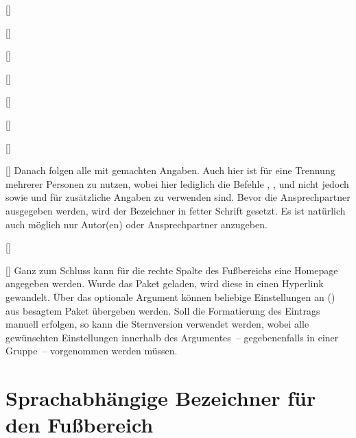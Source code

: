 \begin{Bundle*}[v2.05]{}
\begin{Declaration}{[]}
\begin{Declaration}{[]}
\begin{Declaration}{[]}
\begin{Declaration}{[]}
\begin{Declaration}{[]}
\begin{Declaration}{[]}
\begin{Declaration}{[]}
\begin{Declaration}{[]}
Danach folgen alle mit  gemachten Angaben. Auch hier ist 
 für eine Trennung mehrerer Personen zu nutzen, wobei hier lediglich 
die Befehle , ,  und 
 nicht jedoch  sowie  und 
 für zusätzliche Angaben zu verwenden sind. Bevor die 
Ansprechpartner ausgegeben werden, wird der Bezeichner  
in fetter Schrift gesetzt. Es ist natürlich auch möglich nur Autor(en) oder 
Ansprechpartner anzugeben.
\end{Declaration}
\end{Declaration}
\end{Declaration}
\end{Declaration}
\end{Declaration}
\end{Declaration}
\end{Declaration}
\end{Declaration}

\begin{Declaration}{[]}
\begin{Declaration}{[]}
\printdeclarationlist%
%
Ganz zum Schluss kann für die rechte Spalte des Fußbereichs eine Homepage 
angegeben werden. Wurde das Paket  geladen, wird diese in 
einen Hyperlink gewandelt. Über das optionale Argument können beliebige 
Einstellungen an () aus besagtem Paket 
übergeben werden. Soll die Formatierung des Eintrags manuell erfolgen, so kann 
die Sternversion  verwendet werden, wobei alle gewünschten 
Einstellungen innerhalb des Argumentes~-- gegebenenfalls in einer Gruppe~-- 
vorgenommen werden müssen.
\end{Declaration}
\end{Declaration}



\section{Sprachabhängige Bezeichner für den Fußbereich}


\end{Bundle*}
